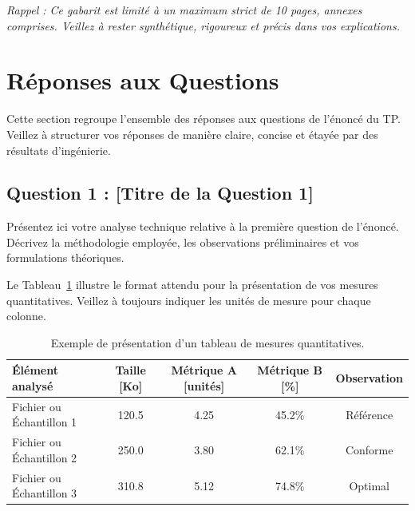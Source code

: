\documentclass[12pt,letterpaper]{article}
\begin{document}
\textit{Rappel : Ce gabarit est limité à un maximum strict de 10 pages, annexes comprises. Veillez à rester synthétique, rigoureux et précis dans vos explications.}

\section{Réponses aux Questions}
\label{sec:reponses}
Cette section regroupe l'ensemble des réponses aux questions de l'énoncé du TP. Veillez à structurer vos réponses de manière claire, concise et étayée par des résultats d'ingénierie.

\subsection{Question 1 : [Titre de la Question 1]}
\label{subsec:q1}
Présentez ici votre analyse technique relative à la première question de l'énoncé. Décrivez la méthodologie employée, les observations préliminaires et vos formulations théoriques.

Le Tableau~\ref{tab:exemple_tableau} illustre le format attendu pour la présentation de vos mesures quantitatives. Veillez à toujours indiquer les unités de mesure pour chaque colonne.

\begin{table}[htbp]
    \centering
    \caption{Exemple de présentation d'un tableau de mesures quantitatives.}
    \label{tab:exemple_tableau}
    \begin{tabular}{lcccc}
        \toprule
        \textbf{Élément analysé} & \textbf{Taille [Ko]} & \textbf{Métrique A [unités]} & \textbf{Métrique B [\%]} & \textbf{Observation} \\
        \midrule
        Fichier ou Échantillon 1 & 120.5 & 4.25 & 45.2\% & Référence \\
        Fichier ou Échantillon 2 & 250.0 & 3.80 & 62.1\% & Conforme \\
        Fichier ou Échantillon 3 & 310.8 & 5.12 & 74.8\% & Optimal \\
        \bottomrule
    \end{tabular}
\end{table}

\end{document}
